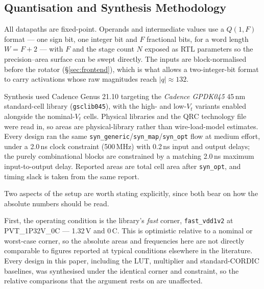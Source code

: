 %
%

\subsection{Quantisation and Synthesis Methodology}
\label{sec:method}

All datapaths are fixed-point. Operands and intermediate values use a
$Q(1,F)$ format --- one sign bit, one integer bit and $F$ fractional bits,
for a word length $W = F + 2$ --- with $F$ and the stage count $N$ exposed as
RTL parameters so the precision--area surface can be swept directly. The
inputs are block-normalised before the rotator (\S\ref{sec:frontend}), which
is what allows a two-integer-bit format to carry activations whose raw
magnitudes reach $|q| \approx 132$.

Synthesis used Cadence Genus 21.10 targeting the \emph{Cadence GPDK045}
45\,nm standard-cell library (\texttt{gsclib045}), with the high- and
low-$V_t$ variants enabled alongside the nominal-$V_t$ cells. Physical
libraries and the QRC technology file were read in, so areas are
physical-library rather than wire-load-model estimates. Every design ran the
same \texttt{syn\_generic}/\texttt{syn\_map}/\texttt{syn\_opt} flow at medium
effort, under a 2.0\,ns clock constraint (500\,MHz) with 0.2\,ns input and
output delays; the purely combinational blocks are constrained by a matching
2.0\,ns maximum input-to-output delay. Reported areas are total cell area
after \texttt{syn\_opt}, and timing slack is taken from the same report.

Two aspects of the setup are worth stating explicitly, since both bear on how
the absolute numbers should be read.

First, the operating condition is the library's \emph{fast} corner,
\texttt{fast\_vdd1v2} at PVT\_1P32V\_0C --- 1.32\,V and 0\,\textdegree C.
This is optimistic relative to a nominal or worst-case corner, so the absolute
areas and frequencies here are not directly comparable to figures reported at
typical conditions elsewhere in the literature. Every design in this paper,
including the LUT, multiplier and standard-CORDIC baselines, was synthesised
under the identical corner and constraint, so the relative comparisons that
the argument rests on are unaffected.

